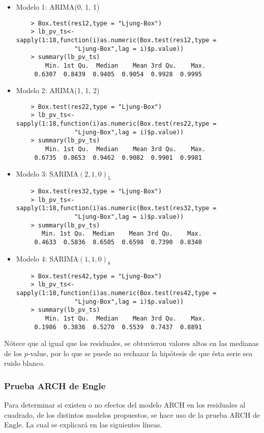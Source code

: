 \documentclass{article}
\theoremstyle{remark}
\begin{document}
\begin{itemize}
	\item Modelo 1: ARIMA(0, 1, 1)
	\begin{verbatim}
    > Box.test(res12,type = "Ljung-Box")
    > lb_pv_ts<-sapply(1:18,function(i)as.numeric(Box.test(res12,type = 
                "Ljung-Box",lag = i)$p.value))
    > summary(lb_pv_ts)
        Min. 1st Qu.  Median    Mean 3rd Qu.    Max. 
     0.6307  0.8439  0.9405  0.9054  0.9928  0.9995 
	\end{verbatim}
	\item Modelo 2: ARIMA(1, 1, 2)
	\begin{verbatim}
	> Box.test(res22,type = "Ljung-Box")
    > lb_pv_ts<-sapply(1:18,function(i)as.numeric(Box.test(res22,type = 
                "Ljung-Box",lag = i)$p.value))
    > summary(lb_pv_ts) 
        Min. 1st Qu.  Median    Mean 3rd Qu.    Max. 
     0.6735  0.8653  0.9462  0.9082  0.9901  0.9981 
	\end{verbatim}
	\item Modelo 3: SARIMA$(2, 1, 0)_5$
	\begin{verbatim}
    > Box.test(res32,type = "Ljung-Box")
    > lb_pv_ts<-sapply(1:18,function(i)as.numeric(Box.test(res32,type =
                "Ljung-Box",lag = i)$p.value))
    > summary(lb_pv_ts) 
       Min. 1st Qu.  Median    Mean 3rd Qu.    Max. 
     0.4633  0.5836  0.6505  0.6598  0.7390  0.8340 
	\end{verbatim}
	\item Modelo 4: SARIMA$(1, 1, 0)_8$
	\begin{verbatim}
    > Box.test(res42,type = "Ljung-Box")
    > lb_pv_ts<-sapply(1:18,function(i)as.numeric(Box.test(res42,type =
                "Ljung-Box",lag = i)$p.value))
    > summary(lb_pv_ts) 
        Min. 1st Qu.  Median    Mean 3rd Qu.    Max. 
     0.1986  0.3836  0.5270  0.5539  0.7437  0.8891  
	\end{verbatim}
\end{itemize}
Nótece que al igual que los residuales, se obtuvieron  valores  altos  en  las  medianas de  los $p$-value,  por lo que se puede no rechazar  la  hipótesis de que ésta serie sea ruido blanco.

\subsubsection{Prueba ARCH de Engle} 
Para determinar si existen o no efectos del modelo ARCH en los residuales al cuadrado, de los distintos modelos propuestos, se hace uso de la prueba ARCH de Engle. La cual se explicará en las siguientes líneas.\\
\end{document}
